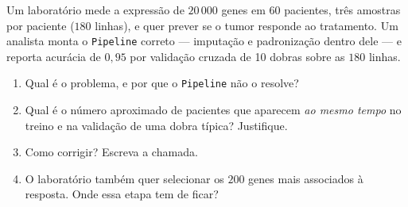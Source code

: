 \documentclass[11pt,a4paper]{article}
\begin{document}
\begin{exercicio}
Um laboratório mede a expressão de $20\,000$ genes em $60$ pacientes, três
amostras por paciente ($180$ linhas), e quer prever se o tumor responde ao
tratamento. Um analista monta o \texttt{Pipeline} correto --- imputação e
padronização dentro dele --- e reporta acurácia de $0{,}95$ por validação cruzada
de 10 dobras sobre as $180$ linhas.
\begin{enumerate}[label=(\alph*),leftmargin=1.1cm]
  \item Qual é o problema, e por que o \texttt{Pipeline} não o resolve?
  \item Qual é o número aproximado de pacientes que aparecem \emph{ao mesmo
        tempo} no treino e na validação de uma dobra típica? Justifique.
  \item Como corrigir? Escreva a chamada.
  \item O laboratório também quer selecionar os $200$ genes mais associados à
        resposta. Onde essa etapa tem de ficar?
\end{enumerate}
\end{exercicio}
\end{document}
